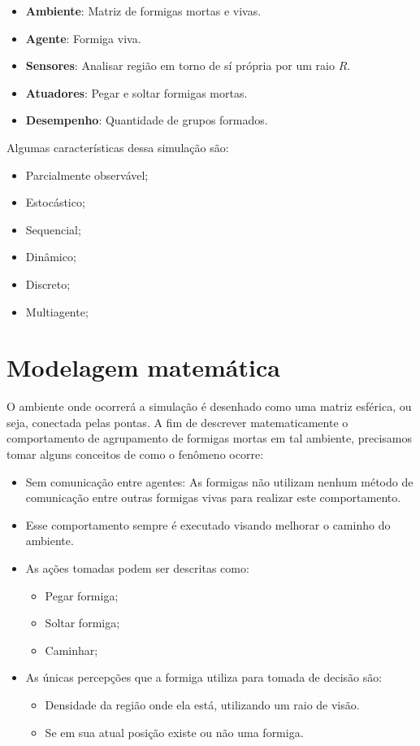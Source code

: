 \documentclass[conference]{IEEEtran}
\begin{document}
\begin{itemize}
    \item \textbf{Ambiente}: Matriz de formigas mortas e vivas.
    \item \textbf{Agente}: Formiga viva.
    \item \textbf{Sensores}: Analisar região em torno de sí própria por um raio $R$.
    \item \textbf{Atuadores}: Pegar e soltar formigas mortas.
    \item \textbf{Desempenho}: Quantidade de grupos formados.
\end{itemize}

Algumas características dessa simulação são:

\begin{itemize}
    \item Parcialmente observável;
    \item Estocástico;
    \item Sequencial;
    \item Dinâmico;
    \item Discreto;
    \item Multiagente;
\end{itemize}

\section{Modelagem matemática}

O ambiente onde ocorrerá a simulação é desenhado como uma matriz esférica, ou seja, conectada pelas pontas. A fim de descrever matematicamente o comportamento de agrupamento de formigas mortas em tal ambiente, precisamos tomar alguns conceitos de como o fenômeno ocorre\cite{b1}:

\begin{itemize}
    \item Sem comunicação entre agentes: As formigas não utilizam nenhum método de comunicação entre outras formigas vivas para realizar este comportamento.
    \item Esse comportamento sempre é executado visando melhorar o caminho do ambiente.
    \item As ações tomadas podem ser descritas como:
    \begin{itemize}
        \item Pegar formiga;
        \item Soltar formiga;
        \item Caminhar;
    \end{itemize}
    \item As únicas percepções que a formiga utiliza para tomada de decisão são:
    \begin{itemize}
        \item Densidade da região onde ela está, utilizando um raio de visão.
        \item Se em sua atual posição existe ou não uma formiga.
    \end{itemize}
\end{itemize}
\end{document}
